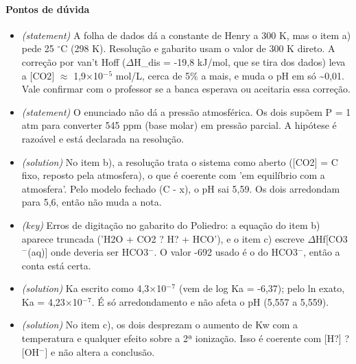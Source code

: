 \documentclass{article}%
\begin{document}
\paragraph{Pontos de dúvida}%
\begin{itemize}%
\item%
\textit{(statement)} A folha de dados dá a constante de Henry a 300 K, mas o item a) pede 25 $^\circ$C (298 K). Resolução e gabarito usam o valor de 300 K direto. A correção por van't Hoff ($\Delta$H\_dis = -19,8 kJ/mol, que se tira dos dados) leva a {[}CO2{]} $\approx$ 1,9$\times$10$^{-}$$^{5}$ mol/L, cerca de 5\% a mais, e muda o pH em só \textasciitilde{}0,01. Vale confirmar com o professor se a banca esperava ou aceitaria essa correção.%
\item%
\textit{(statement)} O enunciado não dá a pressão atmosférica. Os dois supõem P = 1 atm para converter 545 ppm (base molar) em pressão parcial. A hipótese é razoável e está declarada na resolução.%
\item%
\textit{(solution)} No item b), a resolução trata o sistema como aberto ({[}CO2{]} = C fixo, reposto pela atmosfera), o que é coerente com 'em equilíbrio com a atmosfera'. Pelo modelo fechado (C - x), o pH sai 5,59. Os dois arredondam para 5,6, então não muda a nota.%
\item%
\textit{(key)} Erros de digitação no gabarito do Poliedro: a equação do item b) aparece truncada ('H2O + CO2 ? H? + HCO'), e o item c) escreve $\Delta$Hf{[}CO3$^{-}$(aq){]} onde deveria ser HCO3$^{-}$. O valor -692 usado é o do HCO3$^{-}$, então a conta está certa.%
\item%
\textit{(solution)} Ka escrito como 4,3$\times$10$^{-}$$^{7}$ (vem de log Ka = -6,37); pelo ln exato, Ka = 4,23$\times$10$^{-}$$^{7}$. É só arredondamento e não afeta o pH (5,557 a 5,559).%
\item%
\textit{(solution)} No item c), os dois desprezam o aumento de Kw com a temperatura e qualquer efeito sobre a 2ª ionização. Isso é coerente com {[}H?{]} ? {[}OH$^{-}${]} e não altera a conclusão.%
\end{itemize}%
\end{document}
